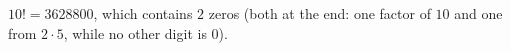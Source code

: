$10!=3628800$, which contains $\boxed{2}$ zeros (both at the end: one factor of $10$ and one from $2\cdot5$, while no other digit is $0$).
